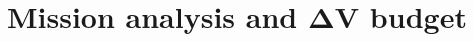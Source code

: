 \section{Mission analysis and \texorpdfstring{$\boldsymbol{\Delta V}$}{Delta-V} budget}
\label{sec:ma_and_dv}

